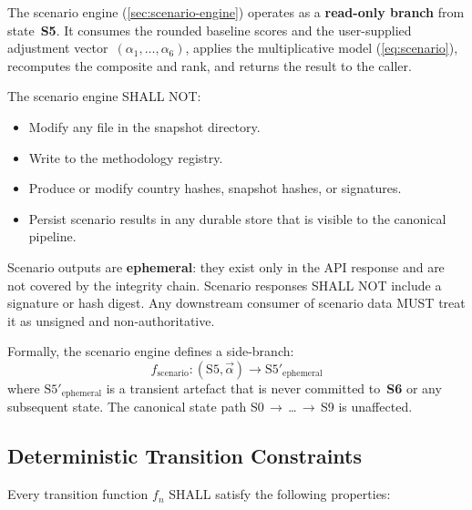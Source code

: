 The scenario engine (\cref{sec:scenario-engine}) operates as a
\textbf{read-only branch} from state~\textbf{S5}.  It consumes the
rounded baseline scores and the user-supplied adjustment
vector~\((\alpha_1, \ldots, \alpha_6)\), applies the multiplicative
model (\cref{eq:scenario}), recomputes the composite and rank, and
returns the result to the caller.

The scenario engine SHALL NOT:

\begin{itemize}
  \item Modify any file in the snapshot directory.
  \item Write to the methodology registry.
  \item Produce or modify country hashes, snapshot hashes, or signatures.
  \item Persist scenario results in any durable store that is visible to
    the canonical pipeline.
\end{itemize}

Scenario outputs are \textbf{ephemeral}: they exist only in the API
response and are not covered by the integrity chain.  Scenario responses
SHALL NOT include a signature or hash digest.  Any downstream consumer of
scenario data MUST treat it as unsigned and non-authoritative.

Formally, the scenario engine defines a side-branch:
\[
  f_{\mathrm{scenario}} : (\mathrm{S5}, \vec{\alpha}) \to
  \mathrm{S5'_{\mathrm{ephemeral}}}
\]
where \(\mathrm{S5'_{\mathrm{ephemeral}}}\) is a transient artefact that
is never committed to~\textbf{S6} or any subsequent state.  The canonical
state path S0\,\(\to\)\,\ldots\,\(\to\)\,S9 is unaffected.

\subsection{Deterministic Transition Constraints}\label{sec:state:constraints}

Every transition function \(f_n\) SHALL satisfy the following properties:

